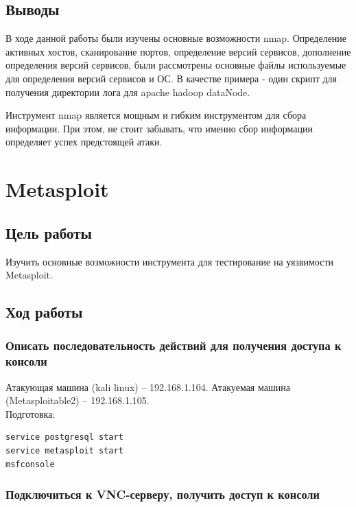 \documentclass[10pt,a4paper]{article}
\begin{document}
\subsection{Выводы}

В ходе данной работы были изучены основные возможности nmap. Определение активных хостов, сканирование портов, определение версий сервисов, дополнение определения версий сервисов, были рассмотрены основные файлы используемые для определения версий сервисов и ОС. В качестве примера - один скрипт для получения директории лога для apache hadoop dataNode. 

Инструмент nmap является мощным и гибким инструментом для сбора информации. При этом, не стоит забывать, что именно сбор информации определяет успех предстоящей атаки.
 
 
\newpage
 
\section{Metasploit}

\subsection{Цель работы}

Изучить основные возможности инструмента для тестирование на уязвимости Metasploit.

\subsection{Ход работы}
 
\subsubsection{Описать последовательность действий для получения доступа к консоли}

Атакующая машина (kali linux) -- 192.168.1.104.
Атакуемая машина (Metasploitable2) -- 192.168.1.105.
\\

Подготовка:

\begin{verbatim}
service postgresql start
service metasploit start
msfconsole
\end{verbatim}

\subsubsection {Подключиться к VNC-серверу, получить доступ к консоли}
\end{document}
